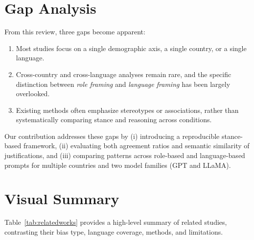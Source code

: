 \section{Gap Analysis}

From this review, three gaps become apparent:  

\begin{enumerate}
    \item Most studies focus on a single demographic axis, a single country, or a single language.  
    \item Cross-country and cross-language analyses remain rare, and the specific distinction between \emph{role framing} and \emph{language framing} has been largely overlooked.  
    \item Existing methods often emphasize stereotypes or associations, rather than systematically comparing stance and reasoning across conditions.  
\end{enumerate}

Our contribution addresses these gaps by (i) introducing a reproducible stance-based framework, (ii) evaluating both agreement ratios and semantic similarity of justifications, and (iii) comparing patterns across role-based and language-based prompts for multiple countries and two model families (GPT and LLaMA).  

\section{Visual Summary}

Table~\ref{tab:relatedworks} provides a high-level summary of related studies, contrasting their bias type, language coverage, methods, and limitations.

